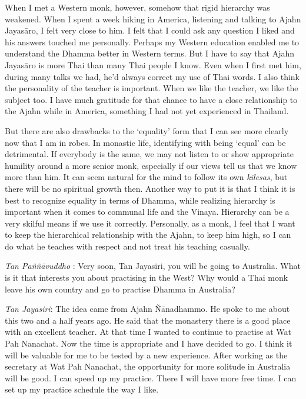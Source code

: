 When I met a Western monk, however, somehow that rigid hierarchy was
weakened. When I spent a week hiking in America, listening and talking
to Ajahn Jayasāro, I felt very close to him. I felt that I could ask any
question I liked and his answers touched me personally. Perhaps my
Western education enabled me to understand the Dhamma better in Western
terms. But I have to say that Ajahn Jayasāro is more Thai than many Thai
people I know. Even when I first met him, during many talks we had, he'd
always correct my use of Thai words. I also think the personality of the
teacher is important. When we like the teacher, we like the subject too.
I have much gratitude for that chance to have a close relationship to
the Ajahn while in America, something I had not yet experienced in
Thailand.

But there are also drawbacks to the `equality' form that I can see more
clearly now that I am in robes. In monastic life, identifying with being
`equal' can be detrimental. If everybody is the same, we may not listen
to or show appropriate humility around a more senior monk, especially if
our views tell us that we know more than him. It can seem natural for
the mind to follow its own \emph{kilesas}, but there will be no
spiritual growth then. Another way to put it is that I think it is best
to recognize equality in terms of Dhamma, while realizing hierarchy is
important when it comes to communal life and the Vinaya. Hierarchy can
be a very skilful means if we use it correctly. Personally, as a monk, I
feel that I want to keep the hierarchical relationship with the Ajahn,
to keep him high, so I can do what he teaches with respect and not treat
his teaching casually.

\emph{Tan Paññāvuddho} : Very soon, Tan Jayasiri, you will be going to
Australia. What is it that interests you about practising in the West?
Why would a Thai monk leave his own country and go to practise Dhamma in
Australia?

\emph{Tan Jayasiri}: The idea came from Ajahn Ñānadhammo. He spoke to me
about this two and a half years ago. He said that the monastery there is
a good place with an excellent teacher. At that time I wanted to
continue to practise at Wat Pah Nanachat. Now the time is appropriate
and I have decided to go. I think it will be valuable for me to be
tested by a new experience. After working as the secretary at Wat Pah
Nanachat, the opportunity for more solitude in Australia will be good. I
can speed up my practice. There I will have more free time. I can set up
my practice schedule the way I like.

